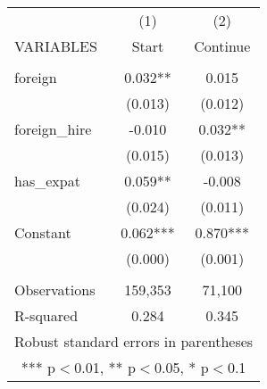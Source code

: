 \begin{tabular}{lcc} \hline
 & (1) & (2) \\
VARIABLES & Start & Continue \\ \hline
 &  &  \\
foreign & 0.032** & 0.015 \\
 & (0.013) & (0.012) \\
foreign\_hire & -0.010 & 0.032** \\
 & (0.015) & (0.013) \\
has\_expat & 0.059** & -0.008 \\
 & (0.024) & (0.011) \\
Constant & 0.062*** & 0.870*** \\
 & (0.000) & (0.001) \\
 &  &  \\
Observations & 159,353 & 71,100 \\
 R-squared & 0.284 & 0.345 \\ \hline
\multicolumn{3}{c}{ Robust standard errors in parentheses} \\
\multicolumn{3}{c}{ *** p$<$0.01, ** p$<$0.05, * p$<$0.1} \\
\end{tabular}
